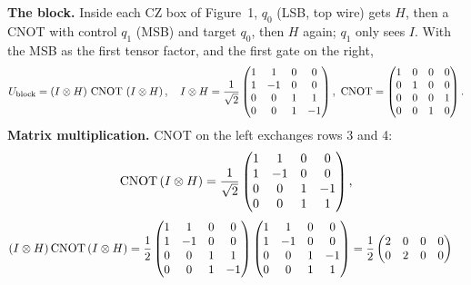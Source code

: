 \documentclass[a4paper, 10pt]{article}
\begin{document}
\begin{solution}
	\noindent \textbf{The block.} Inside each CZ box of Figure~1, \( q_0 \) (LSB, top wire) gets \( H \), then a CNOT with control \( q_1 \) (MSB) and target \( q_0 \), then \( H \) again; \( q_1 \) only sees \( I \).
	With the MSB as the first tensor factor, and the first gate on the right,
	\[
		U_{\text{block}} = \left(I \otimes H\right)\,\mathrm{CNOT}\,\left(I \otimes H\right), \quad
		I \otimes H = \frac{1}{\sqrt{2}}\begin{pmatrix}
			1 & 1  & 0 & 0  \\
			1 & -1 & 0 & 0  \\
			0 & 0  & 1 & 1  \\
			0 & 0  & 1 & -1
		\end{pmatrix}, \
		\mathrm{CNOT} = \begin{pmatrix}
			1 & 0 & 0 & 0 \\
			0 & 1 & 0 & 0 \\
			0 & 0 & 0 & 1 \\
			0 & 0 & 1 & 0
		\end{pmatrix}.
	\]
	\noindent \textbf{Matrix multiplication.} CNOT on the left exchanges rows 3 and 4:
	\[
		\mathrm{CNOT}\left(I \otimes H\right) = \frac{1}{\sqrt{2}}\begin{pmatrix}
			1 & 1  & 0 & 0  \\
			1 & -1 & 0 & 0  \\
			0 & 0  & 1 & -1 \\
			0 & 0  & 1 & 1
		\end{pmatrix},
	\]
	\begin{align*}
		\left(I \otimes H\right)\mathrm{CNOT}\left(I \otimes H\right)
		 & = \frac{1}{2}\begin{pmatrix}
			                1 & 1  & 0 & 0  \\
			                1 & -1 & 0 & 0  \\
			                0 & 0  & 1 & 1  \\
			                0 & 0  & 1 & -1
		                \end{pmatrix}
		\begin{pmatrix}
			1 & 1  & 0 & 0  \\
			1 & -1 & 0 & 0  \\
			0 & 0  & 1 & -1 \\
			0 & 0  & 1 & 1
		\end{pmatrix}
		= \frac{1}{2}\begin{pmatrix}
			             2 & 0 & 0 & 0  \\
			             0 & 2 & 0 & 0  \\

\end{pmatrix}
\end{align*}
\end{solution}
\end{document}
